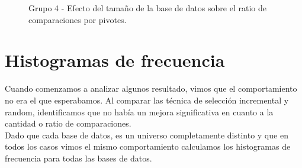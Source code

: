 \begin{figure}[H]
\centering
{}
		\caption{\small Grupo 4 - Efecto del tamaño de la base de datos sobre el ratio de comparaciones por pivotes.}
		\label{fig:EDB-g4}
\end{figure}
 
 \section{Histogramas de frecuencia}
 
Cuando comenzamos a analizar algunos resultado, vimos que el comportamiento no era el que esperabamos. Al comparar las  t\'ecnica de selecci\'on incremental y random, identificamos que no hab\'ia un mejora significativa en cuanto a la cantidad o ratio de comparaciones.\\

Dado que cada base de datos, es un universo completamente distinto y que en todos los casos vimos el mismo comportamiento calculamos los histogramas de frecuencia para todas las bases de datos.\\



 
